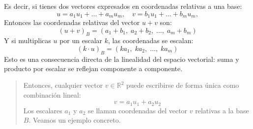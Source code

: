 Es decir, si tienes dos vectores expresados en coordenadas relativas a una base:
\[
u = a_1 u_1 + \dots + a_m u_m,\quad
v = b_1 u_1 + \dots + b_m u_m,
\]
Entonces las coordenadas relativas del vector \(u + v\) son:
\[
(u+v)_B = (a_1 + b_1,\; a_2 + b_2,\; \dots,\; a_m + b_m)
\]
Y si multiplicas \(u\) por un escalar \(k\), las coordenadas se escalan:
\[
(k\cdot u)_B = (k a_1,\; k a_2,\; \dots,\; k a_m)
\]
Esto es una consecuencia directa de la linealidad del espacio vectorial: suma y producto por escalar se reflejan componente a componente.

\begin{quote}

  Entonces, cualquier vector \(v \in \mathbb{R}^2\) puede escribirse de forma única como combinación lineal:
  \[
  v = a_1 u_1 + a_2 u_2
  \]
  Los escalares \(a_1\) y \(a_2\) se llaman coordenadas del vector \(v\) relativas a la base \(B\). Veamos un ejemplo concreto.


\end{quote}
